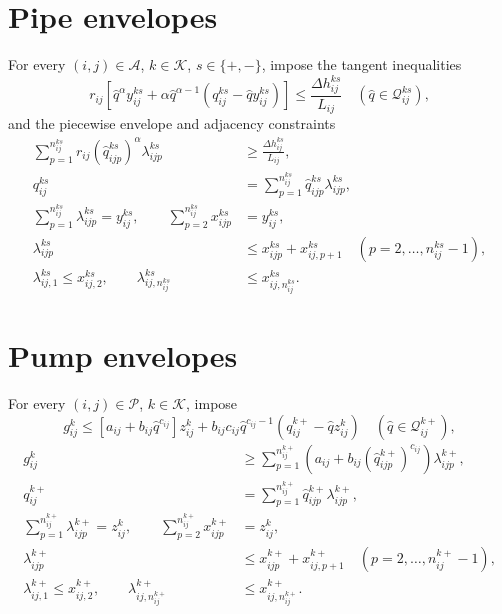 \documentclass{article}
\begin{document}
\section*{Pipe envelopes}
For every $(i,j)\in\mathcal A$, $k\in\mathcal K$, $s\in\{+,-\}$, impose the tangent inequalities
\begin{equation}
r_{ij}\left[\widehat q^{\alpha}y_{ij}^{ks}
+\alpha\widehat q^{\alpha-1}(q_{ij}^{ks}-\widehat qy_{ij}^{ks})\right]
\le\frac{\Delta h_{ij}^{ks}}{L_{ij}}
\quad(\widehat q\in\mathcal Q_{ij}^{ks}),
\tag{18}
\end{equation}
and the piecewise envelope and adjacency constraints
\begin{align}
\sum_{p=1}^{n_{ij}^{ks}}r_{ij}(\widehat q_{ijp}^{ks})^\alpha\lambda_{ijp}^{ks}
&\ge\frac{\Delta h_{ij}^{ks}}{L_{ij}}, \tag{22}\\
q_{ij}^{ks}&=\sum_{p=1}^{n_{ij}^{ks}}\widehat q_{ijp}^{ks}\lambda_{ijp}^{ks}, \tag{23}\\
\sum_{p=1}^{n_{ij}^{ks}}\lambda_{ijp}^{ks}=y_{ij}^{ks},\qquad
\sum_{p=2}^{n_{ij}^{ks}}x_{ijp}^{ks}&=y_{ij}^{ks}, \tag{24a}\\
\lambda_{ijp}^{ks}&\le x_{ijp}^{ks}+x_{ij,p+1}^{ks}
\quad(p=2,\ldots,n_{ij}^{ks}-1), \tag{24b}\\
\lambda_{ij,1}^{ks}\le x_{ij,2}^{ks},\qquad
\lambda_{ij,n_{ij}^{ks}}^{ks}&\le x_{ij,n_{ij}^{ks}}^{ks}. \tag{24c}
\end{align}

\section*{Pump envelopes}
For every $(i,j)\in\mathcal P$, $k\in\mathcal K$, impose
\begin{equation}
g_{ij}^k\le[a_{ij}+b_{ij}\widehat q^{c_{ij}}]z_{ij}^k
+b_{ij}c_{ij}\widehat q^{c_{ij}-1}(q_{ij}^{k+}-\widehat qz_{ij}^k)
\quad(\widehat q\in\mathcal Q_{ij}^{k+}),
\tag{20}
\end{equation}
\begin{align}
g_{ij}^k&\ge\sum_{p=1}^{n_{ij}^{k+}}
\left(a_{ij}+b_{ij}(\widehat q_{ijp}^{k+})^{c_{ij}}\right)\lambda_{ijp}^{k+}, \tag{25}\\
q_{ij}^{k+}&=\sum_{p=1}^{n_{ij}^{k+}}\widehat q_{ijp}^{k+}\lambda_{ijp}^{k+}, \tag{26}\\
\sum_{p=1}^{n_{ij}^{k+}}\lambda_{ijp}^{k+}=z_{ij}^k,\qquad
\sum_{p=2}^{n_{ij}^{k+}}x_{ijp}^{k+}&=z_{ij}^k, \tag{27a}\\
\lambda_{ijp}^{k+}&\le x_{ijp}^{k+}+x_{ij,p+1}^{k+}
\quad(p=2,\ldots,n_{ij}^{k+}-1), \tag{27b}\\
\lambda_{ij,1}^{k+}\le x_{ij,2}^{k+},\qquad
\lambda_{ij,n_{ij}^{k+}}^{k+}&\le x_{ij,n_{ij}^{k+}}^{k+}. \tag{27c}
\end{align}
\end{document}
